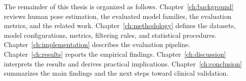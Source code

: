 The remainder of this thesis is organized as follows. Chapter~\ref{ch:background} reviews human pose estimation, the evaluated model families, the evaluation metrics, and the related work. Chapter~\ref{ch:methodology} defines the datasets, model configurations, metrics, filtering rules, and statistical procedures. Chapter~\ref{ch:implementation} describes the evaluation pipeline. Chapter~\ref{ch:results} reports the empirical findings. Chapter~\ref{ch:discussion} interprets the results and derives practical implications. Chapter~\ref{ch:conclusion} summarizes the main findings and the next steps toward clinical validation.
